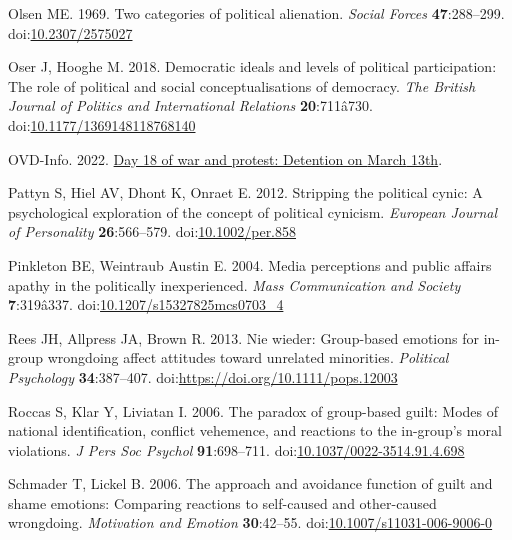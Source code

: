 \documentclass[
]{article}
\newlength{\cslhangindent}
\newenvironment{CSLReferences}[2] %
 {\begin{list}{}{%
  \setlength{\itemindent}{0pt}
  \setlength{\leftmargin}{0pt}
  \setlength{\parsep}{0pt}
  \ifodd #1
   \setlength{\leftmargin}{\cslhangindent}
   \setlength{\itemindent}{-1\cslhangindent}
  \fi
  \setlength{\itemsep}{#2\baselineskip}}}
 {\end{list}}
\begin{document}
\begin{CSLReferences}{1}{0}
Olsen ME. 1969. Two categories of political alienation. \emph{Social Forces} \textbf{47}:288--299. doi:\href{https://doi.org/10.2307/2575027}{10.2307/2575027}

Oser J, Hooghe M. 2018. Democratic ideals and levels of political participation: The role of political and social conceptualisations of democracy. \emph{The British Journal of Politics and International Relations} \textbf{20}:711â730. doi:\href{https://doi.org/10.1177/1369148118768140}{10.1177/1369148118768140}

OVD-Info. 2022. \href{https://en.ovdinfo.org/day-18-war-and-protest-detention-march-13th}{Day 18 of war and protest: Detention on {March} 13th}.

Pattyn S, Hiel AV, Dhont K, Onraet E. 2012. Stripping the political cynic: A psychological exploration of the concept of political cynicism. \emph{European Journal of Personality} \textbf{26}:566--579. doi:\href{https://doi.org/10.1002/per.858}{10.1002/per.858}

Pinkleton BE, Weintraub Austin E. 2004. Media perceptions and public affairs apathy in the politically inexperienced. \emph{Mass Communication and Society} \textbf{7}:319â337. doi:\href{https://doi.org/10.1207/s15327825mcs0703_4}{10.1207/s15327825mcs0703\_4}

Rees JH, Allpress JA, Brown R. 2013. Nie wieder: Group-based emotions for in-group wrongdoing affect attitudes toward unrelated minorities. \emph{Political Psychology} \textbf{34}:387--407. doi:\url{https://doi.org/10.1111/pops.12003}

Roccas S, Klar Y, Liviatan I. 2006. The paradox of group-based guilt: Modes of national identification, conflict vehemence, and reactions to the in-group's moral violations. \emph{J Pers Soc Psychol} \textbf{91}:698--711. doi:\href{https://doi.org/10.1037/0022-3514.91.4.698}{10.1037/0022-3514.91.4.698}

Schmader T, Lickel B. 2006. The approach and avoidance function of guilt and shame emotions: Comparing reactions to self-caused and other-caused wrongdoing. \emph{Motivation and Emotion} \textbf{30}:42--55. doi:\href{https://doi.org/10.1007/s11031-006-9006-0}{10.1007/s11031-006-9006-0}


\end{CSLReferences}
\end{document}
